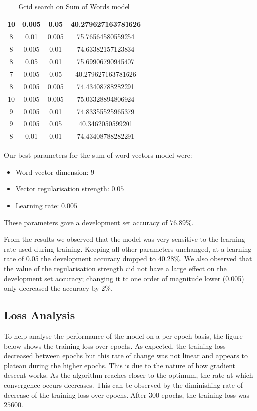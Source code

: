 \documentclass{article} %
\begin{document}
\begin{table}[htb]
{\begin{tabular}{|c|c|c|c|}
10 & 0.005 & 0.05 & 40.279627163781626 \\ \hline
8 & 0.01 & 0.005 & 75.76564580559254 \\ \hline
8 & 0.005 & 0.01 & 74.63382157123834 \\ \hline
8 & 0.05 & 0.01 & 75.69906790945407 \\ \hline
7 & 0.005 & 0.05 & 40.279627163781626 \\ \hline
8 & 0.005 & 0.005 & 74.43408788282291 \\ \hline
10 & 0.005 & 0.005 & 75.03328894806924 \\ \hline
9 & 0.005 & 0.01 & 74.83355525965379 \\ \hline
9 & 0.005 & 0.05 & 40.3462050599201 \\ \hline
8 & 0.01 & 0.01 & 74.43408788282291 \\	 \hline
\end{tabular}
\label{mainresults}
}
\caption{Grid search on Sum of Words model}
\end{table}

Our best parameters for the sum of word vectors model were:

\begin{itemize}

\item Word vector dimension: $9$
\item Vector regularisation strength: $0.05$
\item Learning rate: $0.005$

\end{itemize}

These parameters gave a development set accuracy of $76.89\%$.

From the results we observed that the model was very sensitive to the learning rate used during training. Keeping all other parameters unchanged, at a learning rate of 0.05 the development accuracy dropped to $40.28\%$. We also observed that the value of the regularisation strength did not have a large effect on the development set accuracy; changing it to one order of magnitude lower (0.005) only decreased the accuracy by $2\%$.

\subsection{Loss Analysis}

To help analyse the performance of the model on a per epoch basis, the figure below shows the training loss over epochs. As expected, the training loss decreased between epochs but this rate of change was not linear and appears to plateau during the higher epochs. This is due to the nature of how gradient descent works. As the algorithm reaches closer to the optimum, the rate at which convergence occurs decreases. This can be observed by the diminishing rate of decrease of the training loss over epochs. After 300 epochs, the training loss was $25600$.
\end{document}
